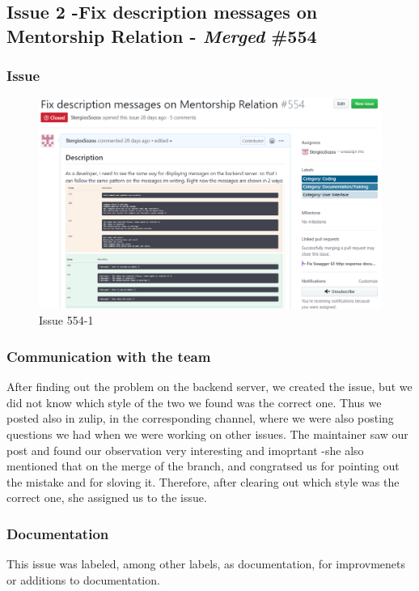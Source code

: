 \documentclass{article}
\begin{document}
\subsection{Issue 2 -Fix description messages on Mentorship Relation - \emph{Merged} \#554}
\subsubsection{Issue}
\begin{figure}[tph!]
\centerline{\includegraphics[totalheight=13cm, width=16cm]{issue554part1.png}}
    \caption{Issue 554-1}
    \label{fig:verticalcell}
\end{figure}

\vfill
\clearpage

\subsubsection{Communication with the team}
After finding out the problem on the backend server, we created the issue, but we did not know which style of the two we found was the correct one. Thus we posted also in zulip, in the corresponding channel, where we were also posting questions we had when we were working on other issues. The maintainer saw our post and found our observation very interesting and imoprtant -she also mentioned that on the merge of the branch, and congratsed us for pointing out the mistake and for sloving it. Therefore, after clearing out which style was the correct one, she assigned us to the issue.
\subsubsection{Documentation}
This issue was labeled, among other labels, as documentation, for improvmenets or additions to documentation.
\end{document}
